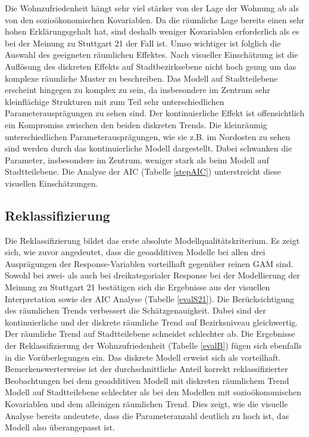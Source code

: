 \documentclass{Vorlage}
\begin{document}
Die Wohnzufriedenheit hängt sehr viel stärker von der Lage der Wohnung ab als von den sozioökonomischen Kovariablen. Da die räumliche Lage bereits einen sehr hohen Erklärungsgehalt hat, sind deshalb weniger Kovariablen erforderlich als es bei der Meinung zu Stuttgart 21 der Fall ist. Umso wichtiger ist folglich die Auswahl des geeigneten räumlichen Effektes. Nach visueller Einschätzung ist die Auflösung des diskreten Effekts auf Stadtbezirksebene nicht hoch genug um das komplexe räumliche Muster zu beschreiben. Das Modell auf Stadtteilebene erscheint hingegen zu komplex zu sein, da insbesondere im Zentrum sehr kleinflächige Strukturen mit zum Teil sehr unterschiedlichen Parameterausprägungen zu sehen sind. Der kontinuierliche Effekt ist offensichtlich ein Kompromiss zwischen den beiden diskreten Trends. Die kleinräumig unterschiedlichen Parameterausprägungen, wie sie z.B. im Nordosten zu sehen sind werden durch das kontinuierliche Modell dargestellt. Dabei schwanken die Parameter, insbesondere im Zentrum, weniger stark als beim Modell auf Stadtteilebene. Die Analyse der AIC (Tabelle \ref{stepAIC}) unterstreicht diese visuellen Einschätzungen.

\subsection{Reklassifizierung}
Die Reklassifizierung bildet das erste absolute Modellqualitätskriterium. Es zeigt sich, wie zuvor angedeutet, dass die geoadditiven Modelle bei allen drei Ausprägungen der Response-Variablen vorteilhaft gegenüber reinen GAM sind. Sowohl bei zwei- als auch bei dreikategorialer Response bei der Modellierung der Meinung zu Stuttgart 21 bestätigen sich die Ergebnisse aus der visuellen Interpretation sowie der AIC Analyse (Tabelle \ref{evalS21}). Die Berücksichtigung des räumlichen Trends verbessert die Schätzgenauigkeit. Dabei sind der kontinuierliche und der diskrete räumliche Trend auf Bezirksniveau gleichwertig. Der räumliche Trend auf Stadtteilebene schneidet schlechter ab. Die Ergebnisse der Reklassifizierung der Wohnzufriedenheit (Tabelle \ref{evalB}) fügen sich ebenfalls in die Vorüberlegungen ein. Das diskrete Modell erweist sich als vorteilhaft. Bemerkenswerterweise ist der durchschnittliche Anteil korrekt reklassifizierter Beobachtungen bei dem geoadditiven Modell mit diskreten räumlichem Trend Modell auf Stadtteilebene schlechter als bei den Modellen mit sozioökonomischen Kovariablen und dem alleinigen räumlichen Trend. Dies zeigt, wie die visuelle Analyse bereits andeutete, dass die Parameteranzahl deutlich zu hoch ist, das Modell also überangepasst ist.
\end{document}

